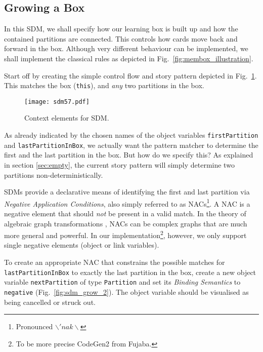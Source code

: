 \newpage
\subsection{Growing a Box}
	
In this SDM, we shall specify how our learning box is built up and how the contained partitions are connected. This controls how cards move back and forward in
the box. Although very different behaviour can be implemented, we shall implement the classical rules as depicted in Fig.~\ref{fig:membox_illustration}.

Start off by creating the simple control flow and story pattern depicted in Fig.~\ref{fig:sdm_grow_1}. This matches the box (\texttt{this}), and \emph{any} two
partitions in the box.
	
\begin{figure}[htbp]
\begin{center}
  \texttt{[image: sdm57.pdf]}
  \caption{Context elements for SDM.}  
  \label{fig:sdm_grow_1}
\end{center}
\end{figure}

As already indicated by the chosen names of the object variables \texttt{first\-Partition} and \texttt{last\-Partition\-In\-Box}, we actually want the pattern
matcher to determine the first and the last partition in the box. But how do we specify this?  As explained in section \ref{sec:empty}, the current story
pattern will simply determine two partitions non-deterministically.

SDMs provide a declarative means of identifying the first and last partition via \emph{Negative Application Conditions}, also simply referred to as
\mbox{NACs}\footnote{Pronounced $\backslash 'nak \backslash$}. A \mbox{NAC} is a negative element that should \emph{not} be present in a valid
 match. In the theory of algebraic graph transformations \cite{EEPT06}, \mbox{NACs} can be complex graphs that are much more general and
powerful. In our implementation\footnote{To be more precise CodeGen2 from Fujaba.}, however, we only support single negative elements (object or link
variables).

To create an appropriate \mbox{NAC} that constrains the possible matches for \texttt{lastPartitionInBox} to exactly the last partition in the box, create a new
object variable \texttt{nextPartition} of type \texttt{Partition} and set  its \emph{Binding Semantics} to \texttt{negative}
(Fig.~\ref{fig:sdm_grow_2}). The object variable should be visualised as being cancelled or struck out.
 
